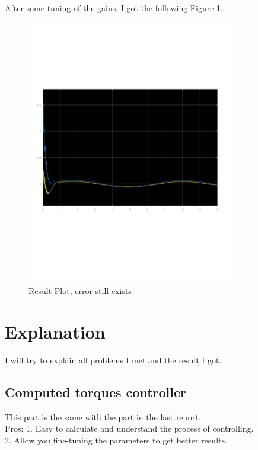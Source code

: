 \documentclass{article}
\begin{document}
After some tuning of the gains, I got the following Figure \ref{fig:result_adaptive_controller}. \\
\begin{figure}[ht]
    \centering
    \includegraphics[width=0.8\textwidth]{figures/result_adaptive_controller.pdf}
    \caption{Result Plot, error still exists}
    \label{fig:result_adaptive_controller}
\end{figure}

\newpage

\section{Explanation}

I will try to explain all problems I met and the result I got.\\


\subsection{Computed torques controller}
This part is the same with the part in the last report.\\ 

Pros: 
1. Easy to calculate and understand the process of controlling.\\
2. Allow you fine-tuning the parameters to get better results.\\
\end{document}
